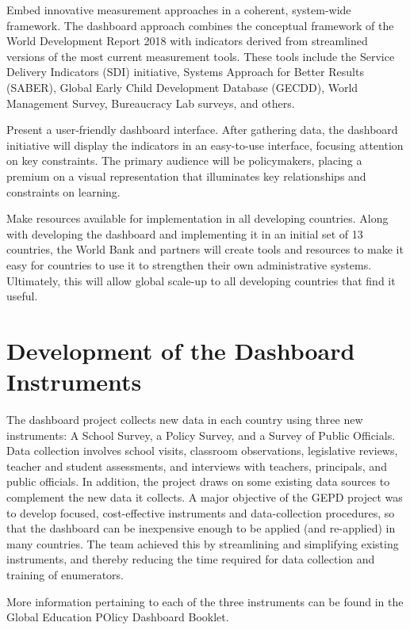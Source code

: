\documentclass[]{article}
\begin{document}
Embed innovative measurement approaches in a coherent, system-wide
framework. The dashboard approach combines the conceptual framework of
the World Development Report 2018 with indicators derived from
streamlined versions of the most current measurement tools. These tools
include the Service Delivery Indicators (SDI) initiative, Systems
Approach for Better Results (SABER), Global Early Child Development
Database (GECDD), World Management Survey, Bureaucracy Lab surveys, and
others.

Present a user-friendly dashboard interface. After gathering data, the
dashboard initiative will display the indicators in an easy-to-use
interface, focusing attention on key constraints. The primary audience
will be policymakers, placing a premium on a visual representation that
illuminates key relationships and constraints on learning.

Make resources available for implementation in all developing countries.
Along with developing the dashboard and implementing it in an initial
set of 13 countries, the World Bank and partners will create tools and
resources to make it easy for countries to use it to strengthen their
own administrative systems. Ultimately, this will allow global scale-up
to all developing countries that find it useful.

\hypertarget{development-of-the-dashboard-instruments}{%
\section{Development of the Dashboard
Instruments}\label{development-of-the-dashboard-instruments}}

The dashboard project collects new data in each country using three new
instruments: A School Survey, a Policy Survey, and a Survey of Public
Officials. Data collection involves school visits, classroom
observations, legislative reviews, teacher and student assessments, and
interviews with teachers, principals, and public officials. In addition,
the project draws on some existing data sources to complement the new
data it collects. A major objective of the GEPD project was to develop
focused, cost-effective instruments and data-collection procedures, so
that the dashboard can be inexpensive enough to be applied (and
re-applied) in many countries. The team achieved this by streamlining
and simplifying existing instruments, and thereby reducing the time
required for data collection and training of enumerators.

More information pertaining to each of the three instruments can be
found in the Global Education POlicy Dashboard Booklet.
\end{document}
